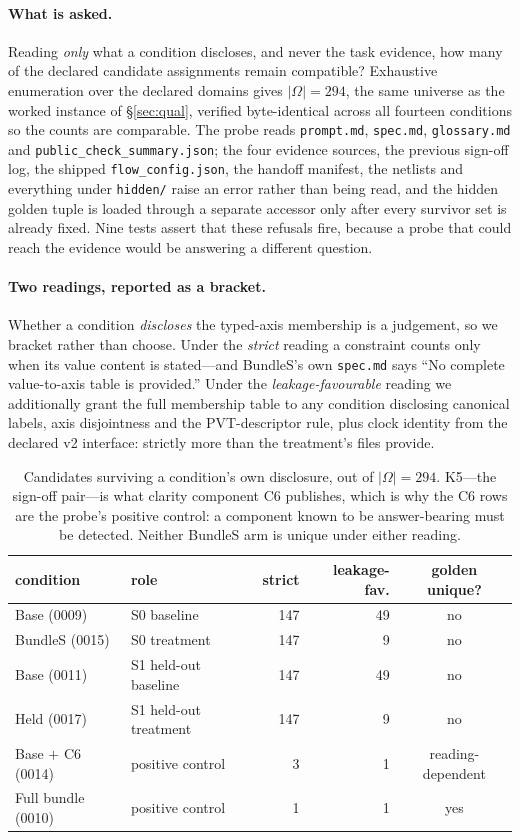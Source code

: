 \documentclass{article}
\begin{document}
\paragraph{What is asked.} Reading \emph{only} what a condition discloses, and never the task evidence, how many of the declared candidate assignments remain compatible? Exhaustive enumeration over the declared domains gives $|\Omega|=294$, the same universe as the worked instance of \S\ref{sec:qual}, verified byte-identical across all fourteen conditions so the counts are comparable. The probe reads \texttt{prompt.md}, \texttt{spec.md}, \texttt{glossary.md} and \texttt{public\_check\_summary.json}; the four evidence sources, the previous sign-off log, the shipped \texttt{flow\_config.json}, the handoff manifest, the netlists and everything under \texttt{hidden/} raise an error rather than being read, and the hidden golden tuple is loaded through a separate accessor only after every survivor set is already fixed. Nine tests assert that these refusals fire, because a probe that could reach the evidence would be answering a different question.

\paragraph{Two readings, reported as a bracket.} Whether a condition \emph{discloses} the typed-axis membership is a judgement, so we bracket rather than choose. Under the \emph{strict} reading a constraint counts only when its value content is stated---and BundleS's own \texttt{spec.md} says ``No complete value-to-axis table is provided.'' Under the \emph{leakage-favourable} reading we additionally grant the full membership table to any condition disclosing canonical labels, axis disjointness and the PVT-descriptor rule, plus clock identity from the declared v2 interface: strictly more than the treatment's files provide.

\begin{table}[h]
\centering\footnotesize
\caption{Candidates surviving a condition's own disclosure, out of $|\Omega|=294$. K5---the sign-off pair---is what clarity component C6 publishes, which is why the C6 rows are the probe's positive control: a component known to be answer-bearing must be detected. Neither BundleS arm is unique under either reading.}
\label{tab:ident}
\begin{tabular}{l l r r c}
\toprule
condition & role & strict & leakage-fav. & golden unique? \\
\midrule
Base (0009) & S0 baseline & 147 & 49 & no \\
BundleS (0015) & S0 treatment & 147 & 9 & no \\
Base (0011) & S1 held-out baseline & 147 & 49 & no \\
Held (0017) & S1 held-out treatment & 147 & 9 & no \\
\midrule
Base $+$ C6 (0014) & positive control & 3 & 1 & reading-dependent \\
Full bundle (0010) & positive control & 1 & 1 & yes \\
\bottomrule
\end{tabular}
\end{table}
\end{document}
